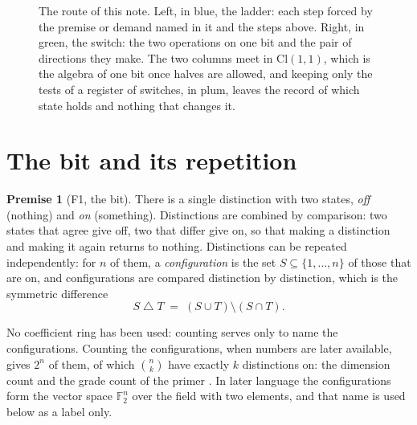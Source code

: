 \documentclass[11pt]{article}
\theoremstyle{plain}
\theoremstyle{definition}
\theoremstyle{plain}
\theoremstyle{definition}
\newtheorem*{premise}{Premise}
\newcommand{\Cl}{\mathrm{Cl}}
\newcommand{\F}{\mathbb{F}}
\begin{document}
\begin{figure}[!ht]
\caption{The route of this note. Left, in blue, the ladder: each step forced by the premise or demand named in it and the steps above. Right, in green, the switch: the two operations on one bit and the pair of directions they make. The two columns meet in $\Cl(1,1)$, which is the algebra of one bit once halves are allowed, and keeping only the tests of a register of switches, in plum, leaves the record of which state holds and nothing that changes it.}
\label{fig:route}
\end{figure}

\section{The bit and its repetition}\label{sec:repetition}

\begin{premise}[F1, the bit]
There is a single distinction with two states, \emph{off} (nothing) and \emph{on} (something). Distinctions are combined by comparison: two states that agree give off, two that differ give on, so that making a distinction and making it again returns to nothing. Distinctions can be repeated independently: for $n$ of them, a \emph{configuration} is the set $S \subseteq \{1, \dots, n\}$ of those that are on, and configurations are compared distinction by distinction, which is the symmetric difference
\[
S \mathbin{\triangle} T \;=\; (S \cup T) \setminus (S \cap T) .
\]
\end{premise}

No coefficient ring has been used: counting serves only to name the configurations. Counting the configurations, when numbers are later available, gives $2^{n}$ of them, of which $\binom{n}{k}$ have exactly $k$ distinctions on: the dimension count and the grade count of the primer \cite[Section 3]{ButlerT0}. In later language the configurations form the vector space $\F_{2}^{n}$ over the field with two elements, and that name is used below as a label only.
\end{document}

